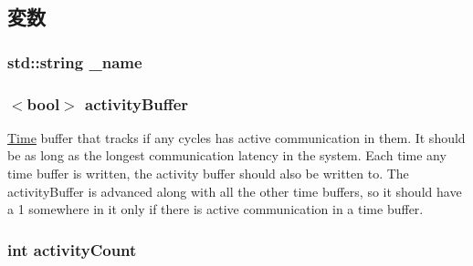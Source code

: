 \subsection{変数}
\hypertarget{classActivityRecorder_aaf2ed934b37cbbd236fdd1b01a5f5005}{
\subsubsection[{\_\-name}]{\setlength{\rightskip}{0pt plus 5cm}std::string {\bf \_\-name}}}
\label{classActivityRecorder_aaf2ed934b37cbbd236fdd1b01a5f5005}
\hypertarget{classActivityRecorder_a6c508a89a541285053c7b900bd730cc2}{
\subsubsection[{activityBuffer}]{$<$bool$>$ {\bf activityBuffer}}}
\label{classActivityRecorder_a6c508a89a541285053c7b900bd730cc2}
\hyperlink{classTime}{Time} buffer that tracks if any cycles has active communication in them. It should be as long as the longest communication latency in the system. Each time any time buffer is written, the activity buffer should also be written to. The activityBuffer is advanced along with all the other time buffers, so it should have a 1 somewhere in it only if there is active communication in a time buffer. \hypertarget{classActivityRecorder_adf01a2f1e7e8ad0795ef04b3a4e6dfb6}{
\subsubsection[{activityCount}]{\setlength{\rightskip}{0pt plus 5cm}int {\bf activityCount}}}
\label{classActivityRecorder_adf01a2f1e7e8ad0795ef04b3a4e6dfb6}
